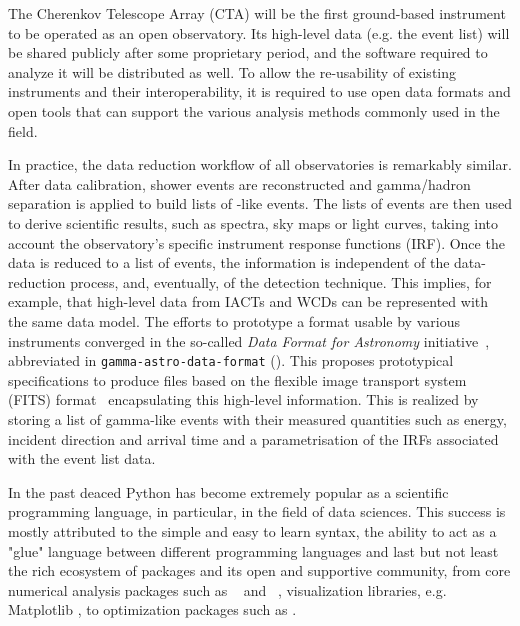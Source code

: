 \documentclass[traditabstract, longauth]{aa}
\begin{document}
The Cherenkov Telescope Array (CTA) will be the first ground-based \gammaray instrument to be operated
as an open observatory. Its high-level data (e.g. the event list) will be shared publicly after
some proprietary period, and the software required to analyze it will be distributed
as well. To allow the re-usability of existing instruments and their interoperability,
it is required to use open data formats and open tools that can support the various analysis methods
commonly used in the field.

In practice, the data reduction workflow of all \gammaray observatories
is remarkably similar. After data calibration, shower events are reconstructed and
gamma/hadron separation is applied to build lists of \gammaray-like events.
The lists of \gammaray events are then used to derive scientific results, such as spectra, sky maps
or light curves, taking into account the observatory's specific instrument response functions (IRF).
Once the data is reduced to a list of events, the information is independent of
the data-reduction process, and, eventually, of the detection technique. This implies,
for example, that high-level data from IACTs and WCDs can be represented
with the same data model. The efforts to prototype a format usable by various instruments
converged in the so-called \textit{Data Format for \gammaray Astronomy}
initiative~\citep{gadf_proc, gadf_universe}, abbreviated in
\texttt{gamma-astro-data-format} (\gadf). This proposes prototypical
specifications to produce files based on the flexible image transport system
(FITS) format~\citep{fits} encapsulating this high-level information. This is
realized by storing a list of gamma-like events with their measured quantities
such as energy, incident direction and arrival time and a parametrisation of
the IRFs associated with the event list data. %

In the past deaced Python has become extremely popular as a scientific programming language,
in particular, in the field of data sciences. This success is
mostly attributed to the simple and easy to learn syntax, the ability to act as
a "glue" language between different programming languages and last but not least
the rich ecosystem of packages and its open and supportive community, from
core numerical analysis packages such as \numpy~\citep{numpy} and
\scipy~\citep{2020SciPy-NMeth}, visualization libraries, e.g. Matplotlib \citep{matplotlib},
to optimization packages such as \iminuit \citep{iminuit}.
\end{document}
